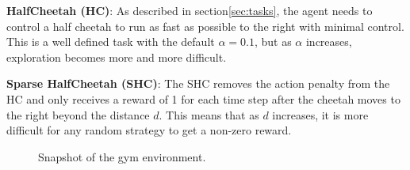 \textbf{HalfCheetah (HC)}: As described in section\ref{sec:tasks}, the agent needs to control a half cheetah to run as fast as possible to the right with minimal control. This is a well defined task with the default $\alpha = 0.1$, but as $\alpha$ increases, exploration becomes more and more difficult.

\textbf{Sparse HalfCheetah (SHC)}: The SHC removes the action penalty from the HC and only receives a reward of 1 for each time step after the cheetah moves to the right beyond the distance $d$. This means that as $d$ increases, it is more difficult for any random strategy to get a non-zero reward.

\begin{figure}[htb]
   \begin{center}   
   \centerline{}
   \centerline{}
   \caption{Snapshot of the gym environment.}
   \label{fig:MC}   
   \end{center}
\end{figure}

